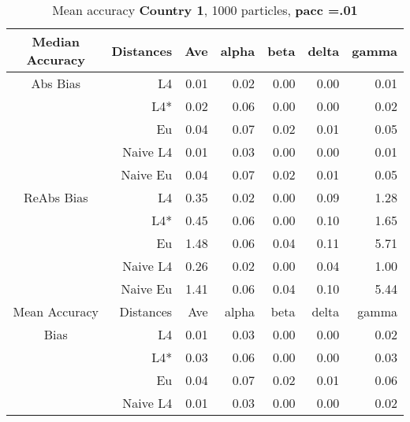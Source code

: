 \documentclass[a4paper,12pt,twoside]{book}
\begin{document}
\begin{table}[H]

\centering
\vfill
\vspace{2cm}
\caption{Mean  accuracy \textbf{Country 1}, 1000 particles, \textbf{pacc =.01}}


\begin{tabular}{crrrrrr}

  \hline
  
{\color{blue}Median Accuracy} & Distances & Ave & alpha & beta & delta & gamma \\ 
  \hline
{\color{blue}Abs Bias} & L4  &0.01 & 0.02 & 0.00 & 0.00 & 0.01 \\ 
  
&L4*  &0.02 & 0.06 & 0.00 & 0.00 & 0.02 \\ 
  
  
&Eu &  0.04 & 0.07 & 0.02 & 0.01 & 0.05 \\ 
  
&Naive L4&      0.01 & 0.03 & 0.00 & 0.00 & 0.01 \\  
  
&Naive Eu &  0.04 & 0.07 & 0.02 & 0.01 & 0.05 \\ 
  
 
   \hline
   
{\color{blue} ReAbs Bias } & L4  & 0.35 & 0.02 & 0.00 & 0.09 & 1.28 \\ 
  
  
&L4*  &0.45 & 0.06 & 0.00 & 0.10 & 1.65 \\ 
  
&Eu &   
  1.48 & 0.06 & 0.04 & 0.11 & 5.71 \\ 
  
&Naive L4&   
  0.26 & 0.02 & 0.00 & 0.04 & 1.00 \\  
&Naive Eu &   1.41 & 0.06 & 0.04 & 0.10 & 5.44 \\ 
  
  
   \hline
{\color{blue}Mean Accuracy} & Distances & Ave & alpha & beta & delta & gamma \\ 
  \hline
{\color{blue}Bias} & L4  &0.01 & 0.03 & 0.00 & 0.00 & 0.02 \\ 
  
&L4*  &  0.03 & 0.06 & 0.00 & 0.00 & 0.03 \\ 
  
  
&Eu &  0.04 & 0.07 & 0.02 & 0.01 & 0.06 \\ 
  
  
&Naive L4&  
 0.01 & 0.03 & 0.00 & 0.00 & 0.02 \\
   

\end{tabular}
\end{table}
\end{document}
